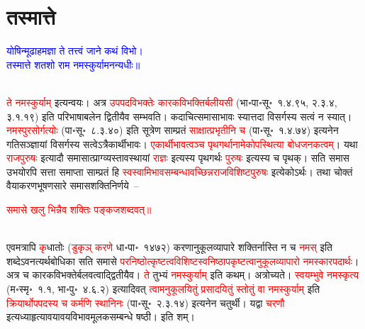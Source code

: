 \section[तस्मात्ते]{तस्मात्ते}
\centering\textcolor{blue}{योषिन्मूढाहमज्ञा ते तत्त्वं जाने कथं विभो।\nopagebreak\\
तस्मात्ते शतशो राम नमस्कुर्यामनन्यधीः॥}\nopagebreak\\
\\
\begin{sloppypar}\justifying\noindent\hspace{10mm} \textcolor{red}{ते नमस्कुर्याम्‌} इत्यन्वयः। अत्र \textcolor{red}{उपपद\-विभक्तेः कारक\-विभक्तिर्बलीयसी} (भा॰पा॰सू॰~१.४.९५, २.३.४, ३.१.१९) इति परिभाषा\-बलेन द्वितीयैव सम्भवति। कदाचित्समासाभावः स्यात्तदा विसर्गस्य सत्वं न स्यात्। \textcolor{red}{नमस्पुरसोर्गत्योः} (पा॰सू॰~८.३.४०) इति सूत्रेण साम्प्रतं \textcolor{red}{साक्षात्प्रभृतीनि च} (पा॰सू॰~१.४.७४) इत्यनेन गति\-सञ्ज्ञायां विसर्गस्य सत्वेऽत्रैकार्थी\-भावः। \textcolor{red}{एकार्थी\-भावत्वञ्च पृथगर्थानामेकोपस्थित्या बोध\-जनकत्वम्‌}। यथा \textcolor{red}{राज\-पुरुषः} इत्यादौ समासात्प्राग्व्यस्तावस्थायां \textcolor{red}{राज्ञः} इत्यस्य पृथगर्थः \textcolor{red}{पुरुषः} इत्यस्य च पृथक्। सति समास उभयोरपि सत्ता समाप्ता साम्प्रतं हि \textcolor{red}{स्व\-स्वामि\-भाव\-सम्बन्धावच्छिन्न\-राज\-विशिष्ट\-पुरुषः} इत्येकोऽर्थः। तथा चोक्तं वैयाकरण\-भूषण\-सारे समास\-शक्ति\-निर्णये~–\end{sloppypar}
\centering\textcolor{red}{समासे खलु भिन्नैव शक्तिः पङ्कजशब्दवत्॥}\nopagebreak\\
\\
\begin{sloppypar}\justifying\noindent\hspace{10mm} एवमत्रापि \textcolor{red}{कृ}धातोः (\textcolor{red}{डुकृञ् करणे} धा॰पा॰~१४७२) करणानुकूल\-व्यापारे शक्तिर्नास्ति न च \textcolor{red}{नमस्‌} इति शब्देऽवनत्यर्थ\-बोधिका सति समासे \textcolor{red}{परनिष्ठोत्कृष्टत्व\-विशिष्ट\-स्वनिष्ठापकृष्टत्वानुकूल\-व्यापारो नमस्कार\-पदार्थः}। अत्र च कारक\-विभक्तेर्बलवत्वाद्द्वितीयैव। \textcolor{red}{ते} तुभ्यं \textcolor{red}{नमस्कुर्याम्‌} इति कथम्। अत्रोच्यते। \textcolor{red}{स्वयम्भुवे नमस्कृत्य} (म॰स्मृ॰~१.१, भा॰पु॰~४.६.२) इत्यादिवत् \textcolor{red}{त्वामनुकूलयितुं प्रसादयितुं स्तोतुं वा नमस्कुर्याम्‌} इति \textcolor{red}{क्रियार्थोपपदस्य च कर्मणि स्थानिनः} (पा॰सू॰~२.३.१४) इत्यनेन चतुर्थी। यद्वा \textcolor{red}{चरणौ} इत्यध्याहृत्यावयावयवि\-भाव\-मूलक\-सम्बन्धे षष्ठी।
इति शम्।\end{sloppypar}
